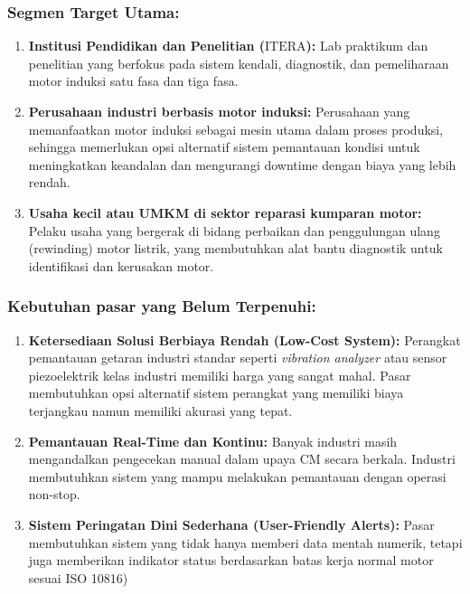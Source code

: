 \documentclass{elsinta}
\begin{document}
\subsubsection*{Segmen Target Utama:}
\begin{enumerate}
    \item \textbf{Institusi Pendidikan dan Penelitian ($\text{ITERA}$):} Lab praktikum dan penelitian yang berfokus pada sistem kendali, diagnostik, dan pemeliharaan motor induksi satu fasa dan tiga fasa.
    \item \textbf{Perusahaan industri berbasis motor induksi:} Perusahaan yang memanfaatkan motor induksi sebagai mesin utama dalam proses produksi, sehingga memerlukan opsi alternatif sistem pemantauan kondisi untuk meningkatkan keandalan dan mengurangi downtime dengan biaya yang lebih rendah.
    \item \textbf{Usaha kecil atau UMKM di sektor reparasi kumparan motor:} Pelaku usaha yang bergerak di bidang perbaikan dan penggulungan ulang (rewinding) motor listrik, yang membutuhkan alat bantu diagnostik untuk identifikasi dan kerusakan motor.
\end{enumerate}

\subsubsection*{Kebutuhan pasar yang Belum Terpenuhi:}
\begin{enumerate}
    \item \textbf{Ketersediaan Solusi Berbiaya Rendah (Low-Cost System):} Perangkat pemantauan getaran industri standar seperti \textit{vibration analyzer} atau sensor piezoelektrik kelas industri memiliki harga yang sangat mahal. Pasar membutuhkan opsi alternatif sistem perangkat yang memiliki biaya terjangkau namun memiliki akurasi yang tepat.
    \item \textbf{Pemantauan Real-Time dan Kontinu:} Banyak industri masih mengandalkan pengecekan manual dalam upaya CM secara berkala. Industri membutuhkan sistem yang mampu melakukan pemantauan dengan operasi non-stop.
    \item \textbf{Sistem Peringatan Dini Sederhana (User-Friendly Alerts):} Pasar membutuhkan sistem yang tidak hanya memberi data mentah numerik, tetapi juga memberikan indikator status berdasarkan batas kerja normal motor sesuai ISO 10816)
\end{enumerate}
\end{document}
